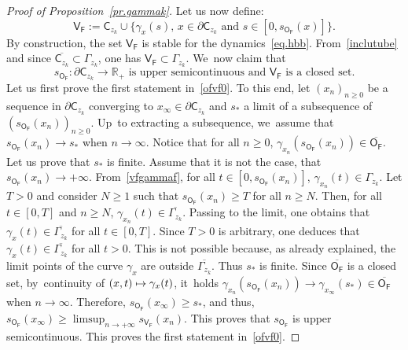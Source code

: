 \documentclass[10pt]{amsart}
\newcommand\mto{\mathchoice{\longmapsto}{\mapsto}{\mapsto}{\mapsto}}
\let\pa\partial
\theoremstyle{plain}
\theoremstyle{definition}
\begin{document}
\begin{proof}[Proof of Proposition~\ref{pr.gammak}]
Let us now define:
\begin{equation}\label{VF}
\mathsf V_{\mathsf F}:= \mathsf C_{z_k} \cup \big \{ \gamma_x(s), \, x\in \pa \mathsf C_{z_k} \text{ and } s\in [0,s_{\mathsf O_{\mathsf F}}(x)]\big \}.
\end{equation}
By construction, the set $\mathsf V_{\mathsf F}$
is stable for the dynamics~\eqref{eq.hbb}. From~\eqref{inclutube} and since $\overline{\mathsf C_{z_k}}\subset \Gamma_{z_k}$, one has $\mathsf V_{\mathsf F}\subset \Gamma_{z_k}$. We~now claim that
\begin{equation}\label{ofvf0}
s_{\mathsf O_{\mathsf F}}: \pa \mathsf C_{z_k}\to \mathbb R_+ \text{ is upper semicontinuous and }
{ \mathsf V_{\mathsf F}}\text{ is a closed set}.
\end{equation}
Let us first prove the first statement in~\eqref{ofvf0}.
To this end, let $(x_n)_{n\ge 0}$ be a sequence in $ \pa { \mathsf C_{z_k}}$ converging to $x_{\infty}\in \pa { \mathsf C_{z_k}}$ and $s_*$ a limit of a subsequence of $(s_{\mathsf O_{\mathsf F}}(x_n))_{n\ge 0}$.
Up~to extracting a subsequence, we~assume that $s_{\mathsf O_{\mathsf F}}(x_n)\to s_*$ when $n\to \infty$.
Notice that for all $n\ge 0$,
$\gamma_{x_n}(s_{\mathsf O_{\mathsf F}}(x_n))\in \overline{\mathsf O_{\mathsf F}}$.
Let us prove that $s_*$ is finite. Assume that it is not the case, \ie that $s_{\mathsf O_{\mathsf F}}(x_n)\to +\infty$. From~\eqref{vfgammaf}, for all $t\in [0,s_{\mathsf O_{\mathsf F}}(x_n)]$, $\gamma_{x_n}(t)\in \Gamma_{z_k}$. Let $T>0$ and consider $N\ge 1$ such that $s_{\mathsf O_{\mathsf F}}(x_n)\ge T$ for all $n\ge N$. Then, for all $t\in [0,T]$ and $n\ge N$, $\gamma_{x_n}(t)\in \overline{\Gamma_{z_k}}$. Passing to the limit, one obtains that
$\gamma_{x}(t)\in \overline{\Gamma_{z_k}}$ for all $t\in [0,T]$. Since $T>0$ is arbitrary, one deduces that $\gamma_{x}(t)\in \overline{\Gamma_{z_k}}$ for all $t>0$. This is not possible because, as already explained, the limit points of the curve $\gamma_{x}$ are outside $ \overline{\Gamma_{z_k}}$. Thus $s_*$ is finite.
Since
$\overline{\mathsf O_{\mathsf F}}$ is a closed set, by~continuity of $(x,t)\mto \gamma_x(t)$, it~holds $\gamma_{x_n}(s_{\mathsf O_{\mathsf F}}(x_n))\to \gamma_{x_{\infty}}(s_*)\in \overline{\mathsf O_{\mathsf F}}$ when $n\to \infty$. Therefore, $s_{\mathsf O_{\mathsf F}}(x_{\infty})\ge s_*$, and thus, $s_{\mathsf O_{\mathsf F}}(x_{\infty})\ge \limsup_{n\to +\infty }s_{\mathsf V_{\mathsf F}}(x_n)$.
This proves that $s_{\mathsf O_{\mathsf F}}$ is upper
semicontinuous. This proves the first statement in~\eqref{ofvf0}.


\end{proof}
\end{document}
